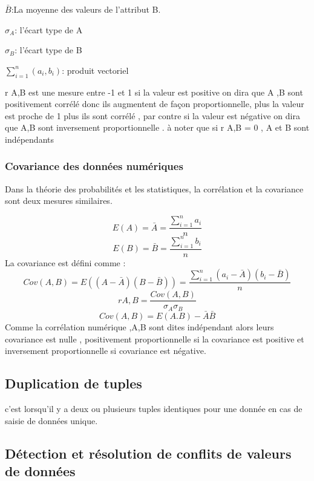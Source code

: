 \documentclass[12pt,a4paper,oneside]{book}
\begin{document}
    $\bar{B}$:La moyenne des valeurs de l'attribut B.
    
    $\sigma_{A}$: l'écart type de A
   
    $\sigma_{B}$: l'écart type de B
    
    $\sum_{i=1}^{n} (a_{i},b_{i})$: produit vectoriel
    
    
    r A,B est une mesure entre -1 et 1 si la valeur est positive on dira que A ,B sont positivement corrélé  donc ils augmentent de façon proportionnelle, plus la valeur est proche de  1 plus ils sont corrélé , par contre si la valeur est négative on dira que A,B sont inversement proportionnelle .
    à noter que si r A,B = 0 , A et B sont indépendants
    \subsubsection{Covariance des données numériques}
    Dans la théorie des probabilités et les statistiques, la corrélation et la covariance sont deux mesures similaires.
    
    \begin{equation*}
     E(A)=\bar{A}=\frac{\sum_{i=1}^{n} a_{i}}{n}
    \end{equation*}
        \begin{equation*}
         E(B)=\bar{B}=\frac{\sum_{i=1}^{n} b_{i}}{n}
        \end{equation*}
     La covariance est défini comme :
     \begin{equation*}
     Cov(A,B)=E((A-\bar{A})(B-\bar{B})) = \frac{\sum_{i=1}^{n} (a_{i}-\bar{A})(b_{i}-\bar{B})}{n }
     \end{equation*}
     \begin{equation*}
      r A,B= \frac{Cov(A,B)}{\sigma_{A}\sigma_{B}}
     \end{equation*}
         \begin{equation*}
           Cov(A,B)= E(A.B)-\bar{A}\bar{B}
          \end{equation*}
      Comme la corrélation numérique ,A,B sont dites indépendant alors leurs covariance est nulle , positivement proportionnelle si la covariance est positive et inversement proportionnelle si covariance est négative.
      \subsection{Duplication de tuples}
      c'est lorsqu'il y a deux ou plusieurs tuples identiques pour une donnée en cas de saisie de données unique.
      \subsection{Détection et résolution de conflits de valeurs de données}
     
\end{document}
